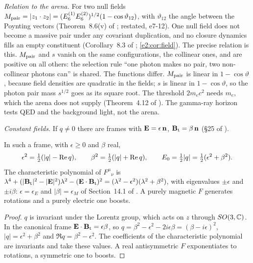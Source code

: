 \emph{Relation to the arena.} For two null fields $M_{\rm pair}=|z_1\cdot z_2|=(E_6^{(1)}E_6^{(2)})^{1/2}(1-\cos\vartheta_{12})$, with $\vartheta_{12}$ the
angle between the Poynting vectors (Theorem~8.6(v) of \cite{RE}; restated, e7-12). One null field does not become a massive pair under any
covariant duplication, and no closure dynamics fills an empty constituent (Corollary~8.3 of \cite{RE}; \cref{e2:cor:field}). The precise
relation is this. $M_{\rm pair}$ and $s$ vanish on the same configurations, the collinear ones, and are positive on all others: the selection
rule ``one photon makes no pair, two non-collinear photons can'' is shared. The functions differ. $M_{\rm pair}$ is linear in $1-\cos\vartheta$,
because field densities are quadratic in the fields; $s$ is linear in $1-\cos\vartheta$, so the photon pair mass $s^{1/2}$ goes as its square root.
The threshold $2m_ec^2$ needs $m_e$, which the arena does not supply (Theorem~4.12 of \cite{RE}). The gamma-ray horizon tests QED and the
background light, not the arena.

\emph{Constant fields.} If $q\neq0$ there are frames with $\mathbf E=\epsilon\,\mathbf n$, $\mathbf B_{\rm t}=\beta\,\mathbf n$ (\S25 of \cite{LandauLifshitz2}).

\begin{proposition}
\label{e7:prop:canon}
In such a frame, with $\epsilon\ge0$ and $\beta$ real,
\[
\epsilon^2=\tfrac12(|q|-\operatorname{Re} q),\qquad \beta^2=\tfrac12(|q|+\operatorname{Re} q),\qquad E_0=\tfrac12|q|=\tfrac12(\epsilon^2+\beta^2).
\]
The characteristic polynomial of $F^\mu{}_\nu$ is $\lambda^4+(|\mathbf B_{\rm t}|^2-|\mathbf E|^2)\lambda^2-(\mathbf E\cdot\mathbf B_{\rm t})^2=(\lambda^2-\epsilon^2)(\lambda^2+\beta^2)$, with
eigenvalues $\pm\epsilon$ and $\pm i\beta$: $\epsilon=\epsilon_E$ and $|\beta|=\epsilon_M$ of Section~14.1 of \cite{ES17}. A purely magnetic $F$
generates rotations and a purely electric one boosts.
\end{proposition}

\begin{proof}
$q$ is invariant under the Lorentz group, which acts on $z$ through $SO(3,\mathbb{C})$. In the canonical frame $\mathbf E\cdot\mathbf B_{\rm t}=\epsilon\beta$, so
$q=\beta^2-\epsilon^2-2i\epsilon\beta=(\beta-i\epsilon)^2$, $|q|=\epsilon^2+\beta^2$ and $\Re q=\beta^2-\epsilon^2$. The coefficients of the
characteristic polynomial are invariants and take these values. A real antisymmetric $F$ exponentiates to rotations, a symmetric one to boosts.
\end{proof}

